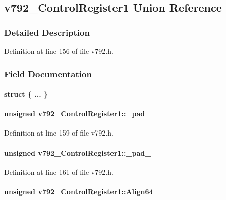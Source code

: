 \subsection{v792\_\-ControlRegister1 Union Reference}
\label{unionv792__ControlRegister1}


\subsubsection{Detailed Description}


Definition at line 156 of file v792.h.

\subsubsection{Field Documentation}
\paragraph[{"@6}]{\setlength{\rightskip}{0pt plus 5cm}struct \{ ... \} }\hfill\label{unionv792__ControlRegister1_a718764f0fa2fe2b0b0a3fee8bd3fef48}
\paragraph[{\_\-pad\_\-1}]{\setlength{\rightskip}{0pt plus 5cm}unsigned {\bf v792\_\-ControlRegister1::\_\-pad\_}}\hfill\label{unionv792__ControlRegister1_a91166930d9ad09a7e273aad8d936134f}


Definition at line 159 of file v792.h.
\paragraph[{\_\-pad\_\-2}]{\setlength{\rightskip}{0pt plus 5cm}unsigned {\bf v792\_\-ControlRegister1::\_\-pad\_}}\hfill\label{unionv792__ControlRegister1_a607ca8664f3e1e058dd5bd3b2e156228}


Definition at line 161 of file v792.h.
\paragraph[{Align64}]{\setlength{\rightskip}{0pt plus 5cm}unsigned {\bf v792\_\-ControlRegister1::Align64}}\hfill\label{unionv792__ControlRegister1_add84e637834883394c770132720e2756}


